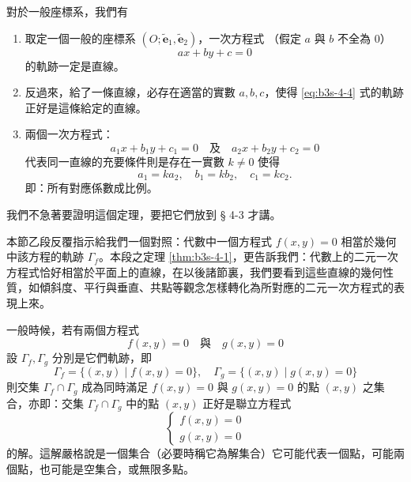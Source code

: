 對於一般座標系，我們有

\begin{theorem}
\label{thm:b3s-4-1}
\begin{enumerate}[label=(\Roman*), leftmargin=2em]
  \item 取定一個一般的座標系 $(O; \tilde{\mathbf{e}}_1, \tilde{\mathbf{e}}_2)$，一次方程式
  （假定 $a$ 與 $b$ 不全為 0）
  \begin{equation}
  ax + by + c = 0
  \label{eq:b3s-4-4}
  \end{equation}
  的軌跡一定是直線。
  \item 反過來，給了一條直線，必存在適當的實數 $a, b, c$，使得 \eqref{eq:b3s-4-4} 式的軌跡正好是這條給定的直線。
  \item 兩個一次方程式：
  \[ a_1 x + b_1 y + c_1 = 0 \quad\text{及}\quad a_2 x + b_2 y + c_2 = 0 \]
  代表同一直線的充要條件則是存在一實數 $k \neq 0$ 使得
  \[ a_1 = k a_2, \quad b_1 = k b_2, \quad c_1 = k c_2. \]
  即：所有對應係數成比例。
\end{enumerate}
\end{theorem}

我們不急著要證明這個定理，要把它們放到 § 4-3 才講。

本節乙段反覆指示給我們一個對照：代數中一個方程式 $f(x, y) = 0$ 相當於幾何中該方程的軌跡 $\Gamma_f$。本段之定理 \ref{thm:b3s-4-1}，更告訴我們：代數上的二元一次方程式恰好相當於平面上的直線，在以後諸節裏，我們要看到這些直線的幾何性質，如傾斜度、平行與垂直、共點等觀念怎樣轉化為所對應的二元一次方程式的表現上來。

一般時候，若有兩個方程式
\[ f(x, y) = 0 \quad\text{與}\quad g(x, y) = 0 \]
設 $\Gamma_f, \Gamma_g$ 分別是它們軌跡，即
\[ \Gamma_f = \{(x, y) \mid f(x, y) = 0\}, \quad \Gamma_g = \{(x, y) \mid g(x, y) = 0\} \]
則交集 $\Gamma_f \cap \Gamma_g$ 成為同時滿足 $f(x, y) = 0$ 與 $g(x, y) = 0$ 的點 $(x, y)$ 之集合，亦即：交集 $\Gamma_f \cap \Gamma_g$ 中的點 $(x, y)$ 正好是聯立方程式
\[ \begin{cases} f(x, y) = 0 \\ g(x, y) = 0 \end{cases} \]
的解。這解嚴格說是一個集合（必要時稱它為解集合）它可能代表一個點，可能兩個點，也可能是空集合，或無限多點。

